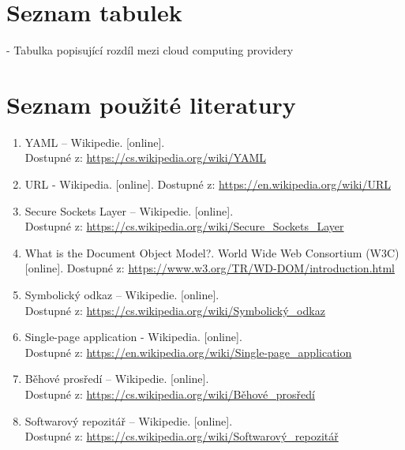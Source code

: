 \documentclass[12pt,a4paper]{report}
\begin{document}
  \chapter{Seznam tabulek}
   - Tabulka popisující rozdíl mezi cloud computing providery  \\
 
  \chapter{Seznam použité literatury}
  \begin{enumerate}
  
    \item \noindent YAML – Wikipedie. [online]. \\ Dostupné z: \url{https://cs.wikipedia.org/wiki/YAML}
    
    \item \noindent URL - Wikipedia. [online]. Dostupné z: \url{https://en.wikipedia.org/wiki/URL}
    
    \item \noindent Secure Sockets Layer – Wikipedie. [online]. \\ Dostupné z: \url{https://cs.wikipedia.org/wiki/Secure\_Sockets\_Layer}
    
    \item \noindent What is the Document Object Model?. World Wide Web Consortium (W3C) [online]. Dostupné z: \url{https://www.w3.org/TR/WD-DOM/introduction.html}
    
    \item \noindent Symbolický odkaz – Wikipedie. [online].\\ Dostupné z: \url{https://cs.wikipedia.org/wiki/Symbolický\_odkaz}

    \item \noindent Single-page application - Wikipedia. [online]. \\ Dostupné z: \url{https://en.wikipedia.org/wiki/Single-page\_application}

    \item \noindent  Běhové prosředí – Wikipedie. [online].\\ Dostupné z: \url{https://cs.wikipedia.org/wiki/Běhové\_prosředí}
    
    \item \noindent Softwarový repozitář – Wikipedie. [online]. \\ Dostupné z: \url{https://cs.wikipedia.org/wiki/Softwarový\_repozitář}
  

\end{enumerate}
\end{document}
